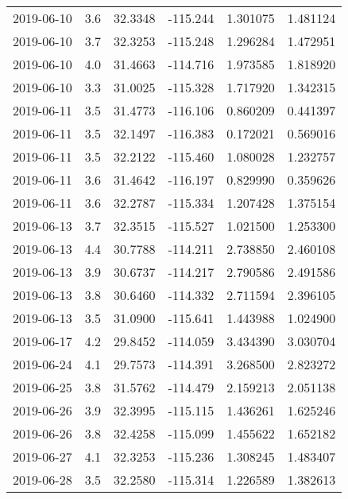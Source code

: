 \begin{tabular}{lrrrrr}
2019-06-10 &       3.6 &  32.3348 &  -115.244 &         1.301075 &         1.481124 \\
2019-06-10 &       3.7 &  32.3253 &  -115.248 &         1.296284 &         1.472951 \\
2019-06-10 &       4.0 &  31.4663 &  -114.716 &         1.973585 &         1.818920 \\
2019-06-10 &       3.3 &  31.0025 &  -115.328 &         1.717920 &         1.342315 \\
2019-06-11 &       3.5 &  31.4773 &  -116.106 &         0.860209 &         0.441397 \\
2019-06-11 &       3.5 &  32.1497 &  -116.383 &         0.172021 &         0.569016 \\
2019-06-11 &       3.5 &  32.2122 &  -115.460 &         1.080028 &         1.232757 \\
2019-06-11 &       3.6 &  31.4642 &  -116.197 &         0.829990 &         0.359626 \\
2019-06-11 &       3.6 &  32.2787 &  -115.334 &         1.207428 &         1.375154 \\
2019-06-13 &       3.7 &  32.3515 &  -115.527 &         1.021500 &         1.253300 \\
2019-06-13 &       4.4 &  30.7788 &  -114.211 &         2.738850 &         2.460108 \\
2019-06-13 &       3.9 &  30.6737 &  -114.217 &         2.790586 &         2.491586 \\
2019-06-13 &       3.8 &  30.6460 &  -114.332 &         2.711594 &         2.396105 \\
2019-06-13 &       3.5 &  31.0900 &  -115.641 &         1.443988 &         1.024900 \\
2019-06-17 &       4.2 &  29.8452 &  -114.059 &         3.434390 &         3.030704 \\
2019-06-24 &       4.1 &  29.7573 &  -114.391 &         3.268500 &         2.823272 \\
2019-06-25 &       3.8 &  31.5762 &  -114.479 &         2.159213 &         2.051138 \\
2019-06-26 &       3.9 &  32.3995 &  -115.115 &         1.436261 &         1.625246 \\
2019-06-26 &       3.8 &  32.4258 &  -115.099 &         1.455622 &         1.652182 \\
2019-06-27 &       4.1 &  32.3253 &  -115.236 &         1.308245 &         1.483407 \\
2019-06-28 &       3.5 &  32.2580 &  -115.314 &         1.226589 &         1.382613 \\

\end{tabular}
